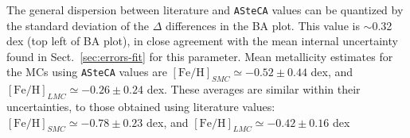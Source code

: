 \documentclass{aa}
\begin{document}
%
%

The general dispersion between literature and \texttt{ASteCA} values can be
quantized by the standard deviation of the $\Delta$ differences in the BA plot.
This value is $\sim$0.32 dex (top left of BA plot), in close agreement with the
mean internal uncertainty found in Sect.~\ref{sec:errors-fit} for this
parameter. Mean metallicity estimates for the MCs using \texttt{ASteCA} values
are $\mathrm{[Fe/H]}_{SMC}{\simeq-}0.52{\pm}0.44$ dex, and
$\mathrm{[Fe/H]}_{LMC}{\simeq-}0.26{\pm}0.24$ dex. These averages are similar
within their uncertainties, to those obtained using literature values:
$\mathrm{[Fe/H]}_{SMC}{\simeq-}0.78{\pm}0.23$ dex, and
$\mathrm{[Fe/H]}_{LMC}{\simeq-}0.42{\pm}0.16$ dex\\
\end{document}
